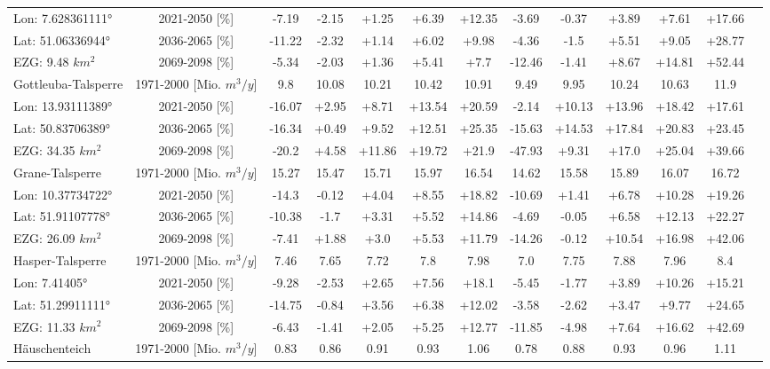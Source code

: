 \begin{longtable}{@{\extracolsep{\fill}}lc|ccccc||cccccc}
\cline{2-13} 
Lon: 7.628361111° & 2021-2050 [\%]  & -7.19 & -2.15 & +1.25 & +6.39 & +12.35 & -3.69 & -0.37 & +3.89 & +7.61 & +17.66 & \\ 
Lat: 51.06336944° & 2036-2065 [\%]  & -11.22 & -2.32 & +1.14 & +6.02 & +9.98 & -4.36 & -1.5 & +5.51 & +9.05 & +28.77 & \\ 
EZG: 9.48 $km^2$ & 2069-2098 [\%]  & -5.34 & -2.03 & +1.36 & +5.41 & +7.7 & -12.46 & -1.41 & +8.67 & +14.81 & +52.44 & \\ 
\hline 
Gottleuba-Talsperre & 1971-2000 [Mio. $m^3/y$]  & 9.8 & 10.08 & 10.21 & 10.42 & 10.91 & 9.49 & 9.95 & 10.24 & 10.63 & 11.9 & \\ 
\cline{2-13} 
Lon: 13.93111389° & 2021-2050 [\%]  & -16.07 & +2.95 & +8.71 & +13.54 & +20.59 & -2.14 & +10.13 & +13.96 & +18.42 & +17.61 & \\ 
Lat: 50.83706389° & 2036-2065 [\%]  & -16.34 & +0.49 & +9.52 & +12.51 & +25.35 & -15.63 & +14.53 & +17.84 & +20.83 & +23.45 & \\ 
EZG: 34.35 $km^2$ & 2069-2098 [\%]  & -20.2 & +4.58 & +11.86 & +19.72 & +21.9 & -47.93 & +9.31 & +17.0 & +25.04 & +39.66 & \\ 
\hline 
Grane-Talsperre & 1971-2000 [Mio. $m^3/y$]  & 15.27 & 15.47 & 15.71 & 15.97 & 16.54 & 14.62 & 15.58 & 15.89 & 16.07 & 16.72 & \\ 
\cline{2-13} 
Lon: 10.37734722° & 2021-2050 [\%]  & -14.3 & -0.12 & +4.04 & +8.55 & +18.82 & -10.69 & +1.41 & +6.78 & +10.28 & +19.26 & \\ 
Lat: 51.91107778° & 2036-2065 [\%]  & -10.38 & -1.7 & +3.31 & +5.52 & +14.86 & -4.69 & -0.05 & +6.58 & +12.13 & +22.27 & \\ 
EZG: 26.09 $km^2$ & 2069-2098 [\%]  & -7.41 & +1.88 & +3.0 & +5.53 & +11.79 & -14.26 & -0.12 & +10.54 & +16.98 & +42.06 & \\ 
\hline 
Hasper-Talsperre & 1971-2000 [Mio. $m^3/y$]  & 7.46 & 7.65 & 7.72 & 7.8 & 7.98 & 7.0 & 7.75 & 7.88 & 7.96 & 8.4 & \\ 
\cline{2-13} 
Lon: 7.41405° & 2021-2050 [\%]  & -9.28 & -2.53 & +2.65 & +7.56 & +18.1 & -5.45 & -1.77 & +3.89 & +10.26 & +15.21 & \\ 
Lat: 51.29911111° & 2036-2065 [\%]  & -14.75 & -0.84 & +3.56 & +6.38 & +12.02 & -3.58 & -2.62 & +3.47 & +9.77 & +24.65 & \\ 
EZG: 11.33 $km^2$ & 2069-2098 [\%]  & -6.43 & -1.41 & +2.05 & +5.25 & +12.77 & -11.85 & -4.98 & +7.64 & +16.62 & +42.69 & \\ 
\hline 
Häuschenteich & 1971-2000 [Mio. $m^3/y$]  & 0.83 & 0.86 & 0.91 & 0.93 & 1.06 & 0.78 & 0.88 & 0.93 & 0.96 & 1.11 & \\ 

\end{longtable}
